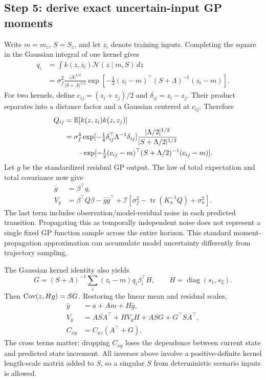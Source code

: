 \subsection{Step 5: derive exact uncertain-input GP moments}
Write $m=m_z$, $S=S_z$, and let $z_i$ denote training inputs. Completing the square in the Gaussian integral of one kernel gives
\begin{align}
 q_i&=\int k(z,z_i)\mathcal N(z\mid m,S)\,dz\\
 &=\sigma_f^2\frac{|\Lambda|^{1/2}}{|S+\Lambda|^{1/2}}
 \exp\left[-\tfrac12(z_i-m)^\top(S+\Lambda)^{-1}(z_i-m)\right].
\end{align}
For two kernels, define $c_{ij}=(z_i+z_j)/2$ and $\delta_{ij}=z_i-z_j$. Their product separates into a distance factor and a Gaussian centered at $c_{ij}$. Therefore
\begin{align}
 Q_{ij}&=\mathbb{E}[k(z,z_i)k(z,z_j)]\\
 &=\sigma_f^4\exp[-\tfrac14\delta_{ij}^\top\Lambda^{-1}\delta_{ij}]
 \frac{|\Lambda/2|^{1/2}}{|S+\Lambda/2|^{1/2}}\nonumber\\
 &\hspace{7mm}\cdot\exp[-\tfrac12(c_{ij}-m)^\top(S+\Lambda/2)^{-1}(c_{ij}-m)].
\end{align}
Let $g$ be the standardized residual GP output. The law of total expectation and total covariance now give
\begin{align}
 \bar g&=\beta^\top q,\\
 V_g&=\beta^\top Q\beta-\bar g\bar g^\top+
 \mathcal I\left[\sigma_f^2-\operatorname{tr}(K_n^{-1}Q)+\sigma_n^2\right].
\end{align}
The last term includes observation/model-residual noise in each predicted transition. Propagating this as temporally independent noise does not represent a single fixed GP function sample across the entire horizon. This standard moment-propagation approximation can accumulate model uncertainty differently from trajectory sampling.

The Gaussian kernel identity also yields
\begin{equation}
 G=(S+\Lambda)^{-1}\sum_i(z_i-m)q_i\beta_i^\top H,
 \qquad H=\operatorname{diag}(s_1,s_2).
\end{equation}
Then $\operatorname{Cov}(z,Hg)=SG$. Restoring the linear mean and residual scales,
\begin{align}
 \bar y&=a+Am+H\bar g,\\
 V_y&=ASA^\top+HV_gH+ASG+G^\top SA^\top,\\
 C_{xy}&=C_{xz}(A^\top+G).
\end{align}
The cross terms matter: dropping $C_{xy}$ loses the dependence between current state and predicted state increment. All inverses above involve a positive-definite kernel length-scale matrix added to $S$, so a singular $S$ from deterministic scenario inputs is allowed.

